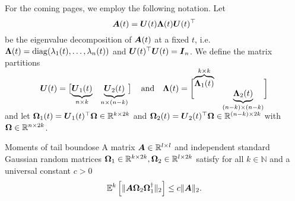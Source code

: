 \documentclass[12pt]{article}
\begin{document}

For the coming pages, we employ the following notation. Let
\begin{equation}
    \boldsymbol{A}(t) 
    = \boldsymbol{U}(t) \boldsymbol{\Lambda}(t) \boldsymbol{U}(t)^{\top} 
\end{equation}
be the eigenvalue decomposition of $\boldsymbol{A}(t)$ at a fixed $t$, i.e. $\boldsymbol{\Lambda}(t) = \operatorname{diag}(\lambda_1(t), \dots, \lambda_n(t))$ and $\boldsymbol{U}(t)^{\top} \boldsymbol{U}(t) = \boldsymbol{I}_n$. We define the matrix partitions
\begin{equation}
    \rule[\dimexpr-2ex-\ht\strutbox]{0pt}{\dimexpr2ex+4ex+\baselineskip}
    \mtx{U}(t) = \begin{bmatrix}
        \smash{\underbrace{\mtx{U}_1(t)}_{n \times k}} & \smash{\underbrace{\mtx{U}_2(t)}_{n \times (n-k)}}
    \end{bmatrix}
    \quad \text{and} \quad
    \mtx{\Lambda}(t) =
    \begin{bmatrix}
        \smash{\overbrace{\mtx{\Lambda}_1(t)}^{k \times k}} & \\ & \smash{\underbrace{\mtx{\Lambda}_2(t)}_{(n-k) \times (n-k)}}
    \end{bmatrix}
\end{equation}
and let $\boldsymbol{\Omega}_1(t) = \boldsymbol{U}_1(t)^{\top} \boldsymbol{\Omega} \in \mathbb{R}^{k \times 2k}$ and $\boldsymbol{\Omega}_2(t) = \boldsymbol{U}_2(t)^{\top} \boldsymbol{\Omega} \in \mathbb{R}^{(n - k) \times 2k}$ with $\boldsymbol{\Omega} \in \mathbb{R}^{n \times 2k}$.

\begin{lemma}{Moments of tail bound}{ose}
    A matrix $\boldsymbol{A} \in \mathbb{R}^{l \times l}$ and independent standard Gaussian random matrices $\boldsymbol{\Omega}_1 \in \mathbb{R}^{k \times 2k}, \boldsymbol{\Omega}_2 \in \mathbb{R}^{l \times 2k}$ satisfy for all $k \in \mathbb{N}$ and a universal constant $c > 0$
    \begin{equation}
        \mathbb{E}^{k}\left[ \lVert \boldsymbol{A} \boldsymbol{\Omega}_2 \boldsymbol{\Omega}_1^{\dagger} \rVert _2 \right] \leq c \lVert \boldsymbol{A} \rVert _2 .
    \end{equation}
\end{lemma}
\end{document}
